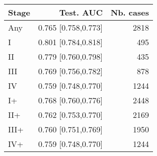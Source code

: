 \begin{table}[ht]
\centering
\begin{tabular}{lrr}
  \toprule
Stage & Test. AUC & Nb. cases \\ 
  \midrule
Any & 0.765 [0.758,0.773] & 2818 \\ 
   \addlinespace
I & 0.801 [0.784,0.818] & 495 \\ 
  II & 0.779 [0.760,0.798] & 435 \\ 
  III & 0.769 [0.756,0.782] & 878 \\ 
  IV & 0.759 [0.748,0.770] & 1244 \\ 
   \addlinespace
I+ & 0.768 [0.760,0.776] & 2448 \\ 
  II+ & 0.762 [0.753,0.770] & 2169 \\ 
  III+ & 0.760 [0.751,0.769] & 1950 \\ 
  IV+ & 0.759 [0.748,0.770] & 1244 \\ 
   \bottomrule
\end{tabular}
\end{table}

